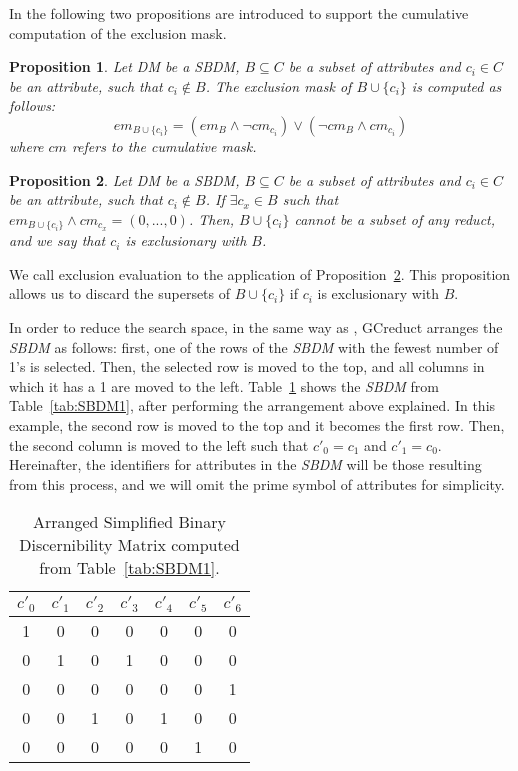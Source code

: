 \documentclass[letterpaper, twoside, openright, 12pt]{book}%
\newtheorem{proposition}{Proposition}
\begin{document}
	In \cite{Lias13} the following two propositions are introduced to support the cumulative computation of the exclusion mask.
	
	\begin{proposition}\label{prop:cumul} 
		Let DM be a SBDM, $B \subseteq C$ be a subset of attributes and $c_i \in C$ be an attribute, such that $c_i \notin B$. The exclusion mask of $B \cup \lbrace c_i\rbrace$ is computed as follows: $$em_{B \cup \lbrace c_i\rbrace}=(em_B \wedge \neg cm_{c_i}) \vee (\neg cm_B \wedge cm_{c_i})$$ where $cm$ refers to the cumulative mask.
	\end{proposition}
	
	\begin{proposition}\label{prop:exclude} 
		Let DM be a SBDM, $B \subseteq C$ be a subset of attributes and $c_i \in C$ be an attribute, such that $c_i \notin B$. If $\exists c_x \in B$ such that $em_{B \cup \lbrace c_i\rbrace} \wedge cm_{c_x}=(0,...,0)$. Then, $B \cup \lbrace c_i\rbrace$ cannot be a subset of any reduct, and we say that $c_i$ is exclusionary with $B$.
	\end{proposition}
	
	We call exclusion evaluation to the application of Proposition~\ref{prop:exclude}. This proposition allows us to discard the supersets of $B \cup \lbrace c_i\rbrace$ if $c_i$ is exclusionary with $B$.
	
	In order to reduce the search space, in the same way as \citep{Sanchez07,Lias13}, GCreduct arranges the \textit{SBDM} as follows: first, one of the rows of the \textit{SBDM} with the fewest number of 1's is selected. Then, the selected row is moved to the top, and all columns in which it has a 1 are moved to the left. Table~\ref{tab:SSBDM1} shows the \textit{SBDM} from Table~\ref{tab:SBDM1}, after performing the arrangement above explained. In this example, the second row is moved to the top and it becomes the first row. Then, the second column is moved to the left such that $c'_0 = c_1$ and $c'_1 = c_0$. Hereinafter, the identifiers for attributes in the \textit{SBDM} will be those resulting from this process, and we will omit the prime symbol of attributes for simplicity.
			
	\begin{table}[htb]
		\caption{Arranged Simplified Binary Discernibility Matrix computed from Table~\ref{tab:SBDM1}.}
		\centering
		\begin{tabular}{ccccccc}\label{tab:SSBDM1}\\
			\hline
			$c'_0$ & $c'_1$ & $c'_2$ & $c'_3$ & $c'_4$ & $c'_5$ & $c'_6$\\
			\hline
			1&0&0&0&0&0&0\\
			0&1&0&1&0&0&0\\
			0&0&0&0&0&0&1\\
			0&0&1&0&1&0&0\\
			0&0&0&0&0&1&0\\
			\hline
		\end{tabular}             
	\end{table}  
	
\end{document}
